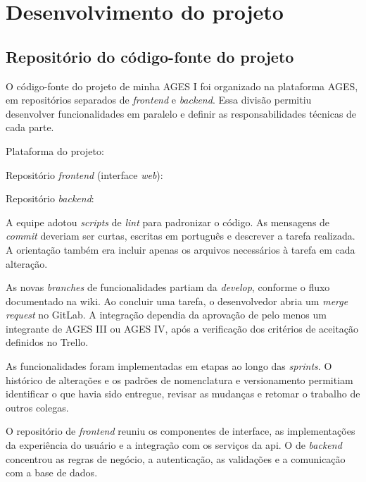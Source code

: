 \section[Desenvolvimento do projeto]{Desenvolvimento do projeto}

\subsection{Repositório do código-fonte do projeto}
    O código-fonte do projeto de minha AGES I foi organizado na plataforma AGES,
em repositórios separados de \textit{frontend} e \textit{backend}. Essa divisão
permitiu desenvolver funcionalidades em paralelo e definir as responsabilidades
técnicas de cada parte.

Plataforma do projeto:

{\footnotesize{}}

Repositório \textit{frontend} (interface \textit{web}):

{\footnotesize{}}

Repositório \textit{backend}:

{\footnotesize{}}

A equipe adotou \textit{scripts} de \textit{lint} para padronizar o código.
As mensagens de \textit{commit} deveriam ser curtas, escritas em português e
descrever a tarefa realizada. A orientação também era incluir apenas os arquivos
necessários à tarefa em cada alteração.

As novas \textit{branches} de funcionalidades partiam da \textit{develop},
conforme o fluxo documentado na wiki. Ao concluir uma tarefa, o desenvolvedor
abria um \textit{merge request} no GitLab. A integração dependia da aprovação de
pelo menos um integrante de AGES III ou AGES IV, após a verificação dos critérios
de aceitação definidos no Trello.

As funcionalidades foram implementadas em etapas ao longo das \textit{sprints}.
O histórico de alterações e os padrões de nomenclatura e versionamento permitiam
identificar o que havia sido entregue, revisar as mudanças e retomar o trabalho
de outros colegas.

O repositório de \textit{frontend} reuniu os componentes de interface, as
implementações da experiência do usuário e a integração com os serviços da
\ac{api}. O de \textit{backend} concentrou as regras de negócio, a autenticação,
as validações e a comunicação com a base de dados.

